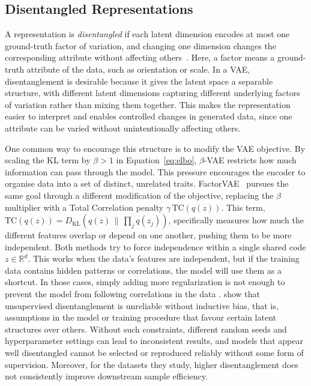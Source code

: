 \subsection{Disentangled Representations}

A representation is \emph{disentangled} if each latent dimension encodes at most one
ground-truth factor of variation, and changing one dimension changes the corresponding
attribute without affecting others~\citep{disentengaled_representation_learning,
on_disentangled_representation_learning}. Here, a factor means a ground-truth attribute of the data, such as orientation or scale. 
In a VAE, disentanglement is desirable because it gives the latent space a separable structure, with different latent dimensions capturing different underlying factors of variation rather than mixing them together. 
This makes the representation easier to interpret and enables controlled changes in generated data, since one attribute can be varied without unintentionally affecting others.


One common way to encourage this structure is to modify the VAE objective. 
By scaling the KL term by $\beta > 1$ in Equation~\ref{eq:elbo}, $\beta$-VAE \citep{Higgins2016betaVAELB} restricts how much information can pass through the model. 
This pressure encourages the encoder to organise data into a set of distinct, unrelated traits.
FactorVAE~\citep{disentangling_by_factorising} pursues the same goal through a different modification of the objective, replacing the $\beta$ multiplier with a Total Correlation penalty $\gamma\,\mathrm{TC}(q(z))$.
This term, $\mathrm{TC}(q(z)) = D_{\mathrm{KL}}(q(z)\,\|\,\prod_j q(z_j))$, specifically measures how much the different features overlap or depend on one another, pushing them to be more independent.
Both methods try to force independence within a single shared code $z \in \mathbb{R}^d$. 
This works when the data's features are independent, but if the training data contains hidden patterns or correlations, the model will use them as a shortcut. 
In those cases, simply adding more regularization is not enough to prevent the model from following correlations in the data \citep{challeau2019challenging}. 
\citet{challeau2019challenging} show that unsupervised disentanglement is unreliable without inductive bias, that is, assumptions in the model or training procedure that favour certain latent structures over others. 
Without such constraints, different random seeds and hyperparameter settings can lead to inconsistent results, and models that appear well disentangled cannot be selected or reproduced reliably without some form of supervision. 
Moreover, for the datasets they study, higher disentanglement does not consistently improve downstream sample efficiency. 

